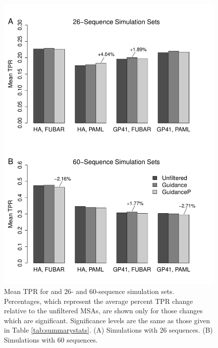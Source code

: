 \documentclass[11pt]{article}
\begin{document}
\begin{figure}[H]
\centerline{\includegraphics[width=4.75in]{Figures/barplot.pdf}}
\caption{\label{barplot} Mean TPR for and 26- and  60-sequence simulation sets. Percentages, which represent the average percent TPR change relative to the unfiltered MSAs, are shown only for those changes which are significant. Significance levels are the same as those given in Table \ref{tab:summarystats}. (A) Simulations with 26 sequences. (B) Simulations with 60 sequences.}
\end{figure}

\bigskip
\end{document}
